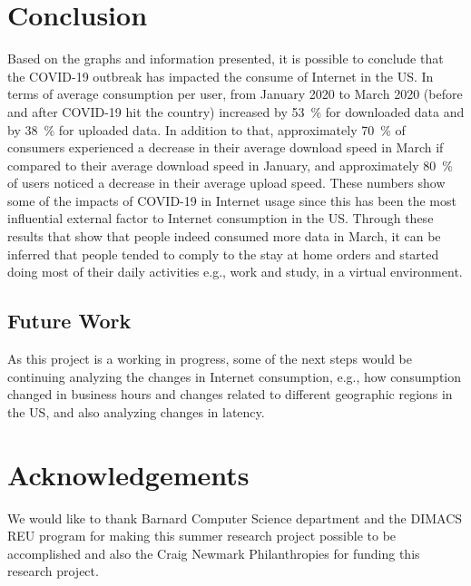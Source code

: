 \documentclass[conference,10pt]{IEEEtran}
\begin{document}
\section{Conclusion}
\label{sec:conclusion}

Based on the graphs and information presented, it is possible to conclude that the COVID-19 outbreak has impacted the consume of Internet in the US. In terms of average consumption per user, from January 2020 to March 2020 (before and after COVID-19 hit the country) increased by \SI{53}{\percent} for downloaded data and by \SI{38}{\percent} for uploaded data. In addition to that, approximately \SI{70}{\percent} of consumers experienced a decrease in their average download speed in March if compared to their average download speed in January, and approximately \SI{80}{\percent} of users noticed a decrease in their average upload speed. These numbers show some of the impacts of COVID-19 in  Internet usage since this has been the most influential external factor to  Internet consumption in the US. Through these results that show that people indeed consumed more data in March, it can be inferred that people tended to comply to the stay at home orders and started doing most of their daily activities e.g., work and study, in a virtual environment.

\subsection{Future Work}
\label{sec:future-work}

As this project is a working in progress, some of the next steps would be continuing analyzing the changes in  Internet consumption, e.g., how consumption changed in business hours and changes related to different geographic regions in the US, and also analyzing changes in latency.

\section{Acknowledgements}
\label{sec:acknowledgements}

We would like to thank Barnard Computer Science department and the DIMACS REU program for making this summer research project possible to be accomplished and also the Craig Newmark Philanthropies for funding this research project.



\end{document}
